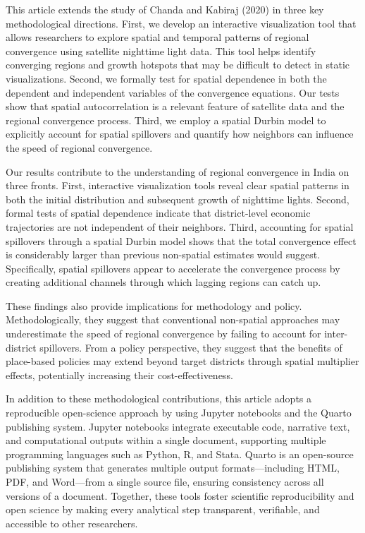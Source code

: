 \documentclass[
  letterpaper,
  DIV=11,
  numbers=noendperiod]{scrartcl}
\begin{document}
This article extends the study of Chanda and Kabiraj (2020) in three key
methodological directions. First, we develop an interactive
visualization tool that allows researchers to explore spatial and
temporal patterns of regional convergence using satellite nighttime
light data. This tool helps identify converging regions and growth
hotspots that may be difficult to detect in static visualizations.
Second, we formally test for spatial dependence in both the dependent
and independent variables of the convergence equations. Our tests show
that spatial autocorrelation is a relevant feature of satellite data and
the regional convergence process. Third, we employ a spatial Durbin
model to explicitly account for spatial spillovers and quantify how
neighbors can influence the speed of regional convergence.

Our results contribute to the understanding of regional convergence in
India on three fronts. First, interactive visualization tools reveal
clear spatial patterns in both the initial distribution and subsequent
growth of nighttime lights. Second, formal tests of spatial dependence
indicate that district-level economic trajectories are not independent
of their neighbors. Third, accounting for spatial spillovers through a
spatial Durbin model shows that the total convergence effect is
considerably larger than previous non-spatial estimates would suggest.
Specifically, spatial spillovers appear to accelerate the convergence
process by creating additional channels through which lagging regions
can catch up.

These findings also provide implications for methodology and policy.
Methodologically, they suggest that conventional non-spatial approaches
may underestimate the speed of regional convergence by failing to
account for inter-district spillovers. From a policy perspective, they
suggest that the benefits of place-based policies may extend beyond
target districts through spatial multiplier effects, potentially
increasing their cost-effectiveness.

In addition to these methodological contributions, this article adopts a
reproducible open-science approach by using Jupyter notebooks and the
Quarto publishing system. Jupyter notebooks integrate executable code,
narrative text, and computational outputs within a single document,
supporting multiple programming languages such as Python, R, and Stata.
Quarto is an open-source publishing system that generates multiple
output formats---including HTML, PDF, and Word---from a single source
file, ensuring consistency across all versions of a document. Together,
these tools foster scientific reproducibility and open science by making
every analytical step transparent, verifiable, and accessible to other
researchers.
\end{document}
